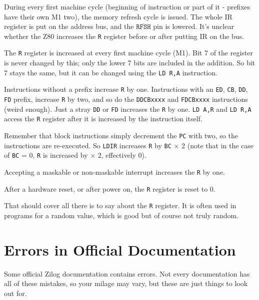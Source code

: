 During every first machine cycle (beginning of instruction or part of it - prefixes have their own M1 two), the memory refresh cycle is issued. The whole IR register is put on the address bus, and the $\mathtt{\overline{RFSH}}$ pin is lowered.  It's unclear whether the Z80 increases the {\tt R} register before or after putting IR on the bus. 

The {\tt R} register is increased at every first machine cycle (M1). Bit 7 of the register is never changed by this; only the lower 7 bits are included in the addition. So bit 7 stays the same, but it can be changed using the
{\tt LD R,A} instruction.

Instructions without a prefix increase {\tt R} by one. Instructions with an {\tt ED}, {\tt CB}, {\tt DD}, {\tt FD} prefix, increase {\tt R} by two, and so do the {\tt DDCBxxxx} and {\tt FDCBxxxx} instructions (weird enough). Just a stray {\tt DD} or {\tt FD} increases the {\tt R} by one. {\tt LD A,R} and {\tt LD R,A} access the {\tt R} register after it is increased by the instruction itself. 

Remember that block instructions simply decrement the {\tt PC} with two, so the instructions are re-executed. So {\tt LDIR} increases {\tt R} by {\tt BC} $\times$ 2 (note that in the case of {\tt BC} = 0, {\tt R} is increased by  $\times$ 2, effectively 0).

Accepting a maskable or non-maskable interrupt increases the {\tt R} by one.

After a hardware reset, or after power on, the {\tt R} register is reset to 0.

That should cover all there is to say about the {\tt R} register. It is often used in programs for a random value, which is good but of course not truly random.


\pagebreak
\section{Errors in Official Documentation}

Some official Zilog documentation contains errors. Not every documentation has all of these mistakes, so your milage may vary, but these are just things to look out for.

